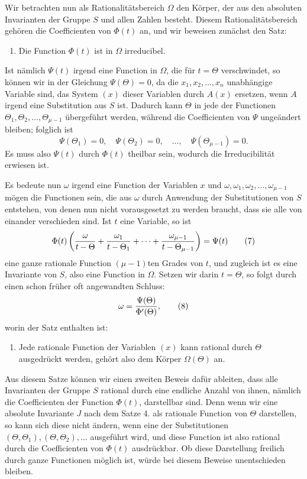 \documentclass[11pt]{article}
\begin{document}
Wir betrachten nun als Rationalitätsbereich $\Omega$ den Körper, der aus den absoluten Invarianten der Gruppe $S$ und allen Zahlen besteht. Diesem Rationalitätsbereich gehören die Coefficienten von $\Phi(t)$ an, und wir beweisen zunächst den Satz:
\begin{enumerate}[label=\arabic*.,leftmargin=2.2em,start=3]
\item Die Function $\Phi(t)$ ist in $\Omega$ irreducibel.
\end{enumerate}
Ist nämlich $\Psi(t)$ irgend eine Function in $\Omega$, die für $t=\Theta$ verschwindet, so können wir in der Gleichung $\Psi(\Theta)=0$, da die $x_1,x_2,\ldots,x_n$ unabhängige Variable sind, das System $(x)$ dieser Variablen durch $A(x)$ ersetzen, wenn $A$ irgend eine Substitution aus $S$ ist. Dadurch kann $\Theta$ in jede der Functionen $\Theta_1,\Theta_2,\ldots,\Theta_{\mu-1}$ übergeführt werden, während die Coefficienten von $\Psi$ ungeändert bleiben; folglich ist
\[
\Psi(\Theta_1)=0,\quad\Psi(\Theta_2)=0,\quad\ldots,\quad\Psi(\Theta_{\mu-1})=0.
\]
Es muss also $\Psi(t)$ durch $\Phi(t)$ theilbar sein, wodurch die Irreducibilität erwiesen ist.

Es bedeute nun $\omega$ irgend eine Function der Variablen $x$ und $\omega,\omega_1,\omega_2,\ldots,\omega_{\mu-1}$ mögen die Functionen sein, die aus $\omega$ durch Anwendung der Substitutionen von $S$ entstehen, von denen nun nicht vorausgesetzt zu werden braucht, dass sie alle von einander verschieden sind. Ist $t$ eine Variable, so ist
\begin{equation}
\Phi(t)\left({\omega\over t-\Theta}+{\omega_1\over t-\Theta_1}+\cdots+{\omega_{\mu-1}\over t-\Theta_{\mu-1}}\right)=\Psi(t)
\tag{7}
\end{equation}
eine ganze rationale Function $(\mu-1)$ten Grades von $t$, und zugleich ist es eine Invariante von $S$, also eine Function in $\Omega$. Setzen wir darin $t=\Theta$, so folgt durch einen schon früher oft angewandten Schluss:
\begin{equation}
\omega={\Psi(\Theta)\over\Phi'(\Theta)},
\tag{8}
\end{equation}
worin der Satz enthalten ist:
\begin{enumerate}[label=\arabic*.,leftmargin=2.2em,start=4]
\item Jede rationale Function der Variablen $(x)$ kann rational durch $\Theta$ ausgedrückt werden, gehört also dem Körper $\Omega(\Theta)$ an.
\end{enumerate}

Aus diesem Satze können wir einen zweiten Beweis dafür ableiten, dass alle Invarianten der Gruppe $S$ rational durch eine endliche Anzahl von ihnen, nämlich die Coefficienten der Function $\Phi(t)$, darstellbar sind. Denn wenn wir eine absolute Invariante $J$ nach dem Satze 4. als rationale Function von $\Theta$ darstellen, so kann sich diese nicht ändern, wenn eine der Substitutionen $(\Theta,\Theta_1),(\Theta,\Theta_2),\ldots$ ausgeführt wird, und diese Function ist also rational durch die Coefficienten von $\Phi(t)$ ausdrückbar. Ob diese Darstellung freilich durch ganze Functionen möglich ist, würde bei diesem Beweise unentschieden bleiben.
\end{document}
